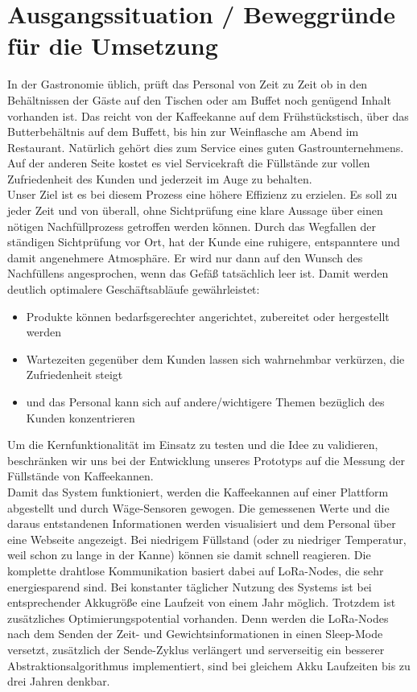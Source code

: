 \chapter{Ausgangssituation / Beweggründe für die Umsetzung}
In der Gastronomie üblich, prüft das Personal von Zeit zu Zeit ob in den Behältnissen der Gäste auf den Tischen oder am Buffet noch genügend Inhalt vorhanden ist. Das reicht von der Kaffeekanne auf dem Frühstückstisch, über das Butterbehältnis auf dem Buffett, bis hin zur Weinflasche am Abend im Restaurant. Natürlich gehört dies zum Service eines guten Gastrounternehmens. Auf der anderen Seite kostet es viel Servicekraft die Füllstände zur vollen Zufriedenheit des Kunden und jederzeit im Auge zu behalten.
\\
Unser Ziel ist es bei diesem Prozess eine höhere Effizienz zu erzielen. Es soll zu jeder Zeit und von überall, ohne Sichtprüfung eine klare Aussage über einen nötigen Nachfüllprozess getroffen werden können. Durch das Wegfallen der ständigen Sichtprüfung vor Ort, hat der Kunde eine ruhigere, entspanntere und damit angenehmere Atmosphäre. Er wird nur dann auf den Wunsch des Nachfüllens angesprochen, wenn das Gefäß tatsächlich leer ist. Damit werden deutlich optimalere Geschäftsabläufe gewährleistet: 
\begin{itemize}
    \item Produkte können bedarfsgerechter angerichtet, zubereitet oder hergestellt werden
    \item Wartezeiten gegenüber dem Kunden lassen sich wahrnehmbar verkürzen, die Zufriedenheit steigt
    \item und das Personal kann sich auf andere/wichtigere Themen bezüglich des Kunden konzentrieren
\end{itemize}
Um die Kernfunktionalität im Einsatz zu testen und die Idee zu validieren, beschränken wir uns bei der Entwicklung unseres Prototyps auf die Messung der Füllstände von Kaffeekannen.
\\ 
 Damit das System funktioniert, werden die Kaffeekannen auf einer Plattform abgestellt und durch Wäge-Sensoren gewogen. Die gemessenen Werte und die daraus entstandenen Informationen werden visualisiert und dem Personal über eine Webseite angezeigt. Bei niedrigem Füllstand (oder zu niedriger Temperatur, weil schon zu lange in der Kanne) können sie damit schnell reagieren. Die komplette drahtlose Kommunikation basiert dabei auf LoRa-Nodes, die sehr energiesparend sind. Bei konstanter täglicher Nutzung des Systems ist bei entsprechender Akkugröße eine Laufzeit von einem Jahr möglich. Trotzdem ist zusätzliches Optimierungspotential vorhanden. Denn werden die LoRa-Nodes nach dem Senden der Zeit- und Gewichtsinformationen in einen Sleep-Mode versetzt, zusätzlich der Sende-Zyklus verlängert und serverseitig ein besserer Abstraktionsalgorithmus implementiert, sind bei gleichem Akku Laufzeiten bis zu drei Jahren denkbar.
